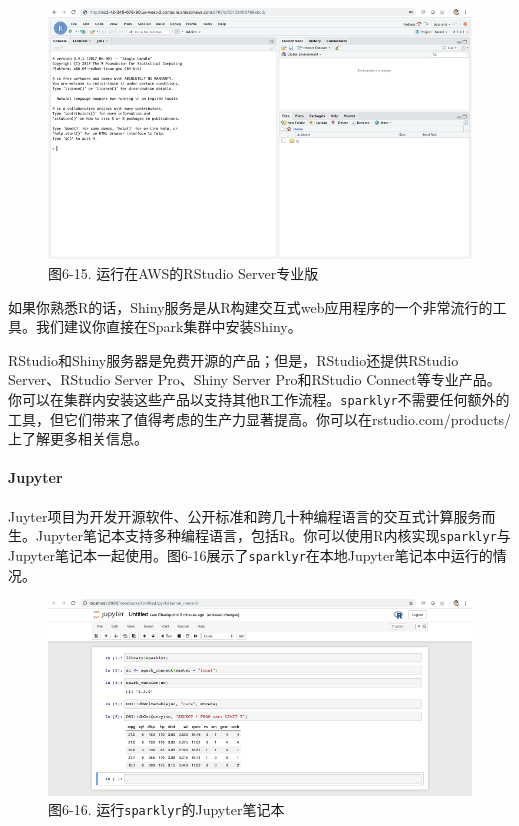 \documentclass[
]{article}
\begin{document}
\begin{figure}
\centering
\includegraphics{figures/6_15.png}
\caption{图6-15. 运行在AWS的RStudio Server专业版}
\end{figure}

如果你熟悉R的话，Shiny服务是从R构建交互式web应用程序的一个非常流行的工具。我们建议你直接在Spark集群中安装Shiny。

RStudio和Shiny服务器是免费开源的产品；但是，RStudio还提供RStudio
Server、RStudio Server Pro、Shiny Server Pro和RStudio
Connect等专业产品。你可以在集群内安装这些产品以支持其他R工作流程。\texttt{sparklyr}不需要任何额外的工具，但它们带来了值得考虑的生产力显著提高。你可以在rstudio.com/products/上了解更多相关信息。

\hypertarget{jupyter}{%
\paragraph{Jupyter}\label{jupyter}}

Juyter项目为开发开源软件、公开标准和跨几十种编程语言的交互式计算服务而生。Jupyter笔记本支持多种编程语言，包括R。你可以使用R内核实现\texttt{sparklyr}与Jupyter笔记本一起使用。图6-16展示了\texttt{sparklyr}在本地Jupyter笔记本中运行的情况。

\begin{figure}
\centering
\includegraphics{figures/6_16.png}
\caption{图6-16. 运行\texttt{sparklyr}的Jupyter笔记本}
\end{figure}
\end{document}
